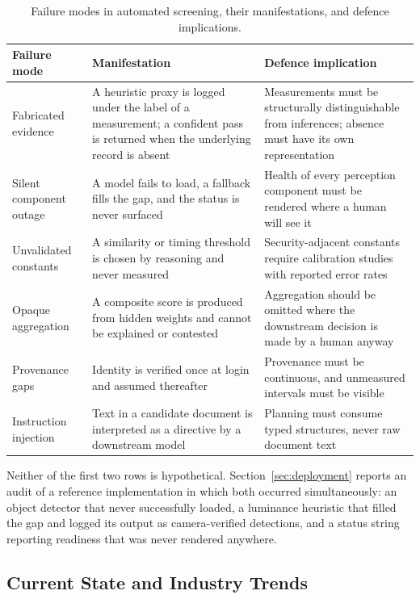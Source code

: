 \begin{table}[t]
\caption{Failure modes in automated screening, their manifestations, and defence
implications.}
\label{tab:threats}
\small
\begin{tabular}{@{}p{2.6cm}p{6.2cm}p{6.6cm}@{}}
\toprule
Failure mode & Manifestation & Defence implication \\
\midrule
Fabricated evidence & A heuristic proxy is logged under the label of a
measurement; a confident pass is returned when the underlying record is absent &
Measurements must be structurally distinguishable from inferences; absence must
have its own representation \\
Silent component outage & A model fails to load, a fallback fills the gap, and
the status is never surfaced & Health of every perception component must be
rendered where a human will see it \\
Unvalidated constants & A similarity or timing threshold is chosen by reasoning
and never measured & Security-adjacent constants require calibration studies with
reported error rates \\
Opaque aggregation & A composite score is produced from hidden weights and cannot
be explained or contested & Aggregation should be omitted where the downstream
decision is made by a human anyway \\
Provenance gaps & Identity is verified once at login and assumed thereafter &
Provenance must be continuous, and unmeasured intervals must be visible \\
Instruction injection & Text in a candidate document is interpreted as a
directive by a downstream model & Planning must consume typed structures, never
raw document text \\
\bottomrule
\end{tabular}
\end{table}

Neither of the first two rows is hypothetical. Section~\ref{sec:deployment} reports an
audit of a reference implementation in which both occurred simultaneously: an
object detector that never successfully loaded, a luminance heuristic that filled
the gap and logged its output as camera-verified detections, and a status string
reporting readiness that was never rendered anywhere.

\subsection{Current State and Industry Trends}

